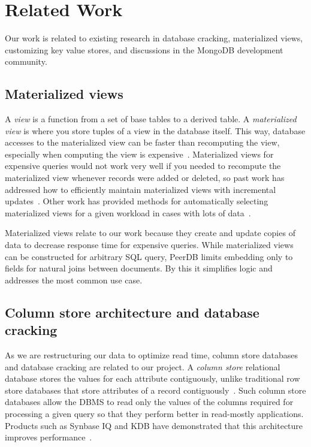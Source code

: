 \section{Related Work}

Our work is related to existing research in database cracking, materialized views, customizing key value stores, and discussions in the MongoDB development community.

\subsection{Materialized views}

A {\em view} is a function from a set of base tables to a derived table.
A {\em materialized view} is where you store tuples of a view in the database itself.
This way, database accesses to the materialized view can be faster than recomputing the view, especially when computing the view is expensive~\cite{Gupta1995}.
Materialized views for expensive queries would not work very well if you needed to recompute the materialized view whenever records were added or deleted, so past work has addressed how to efficiently maintain materialized views with incremental updates~\cite{Larson1985,Blakeley1986,Gupta1995,Zhou2007,Zhou2007a}.
Other work has provided methods for automatically selecting materialized views for a given workload in cases with lots of data~\cite{Agrawal2000,Yang1997}. 

Materialized views relate to our work because they create and update copies of data to decrease response time for expensive queries.
While materialized views can be constructed for arbitrary SQL query, PeerDB limits embedding only to fields for natural joins between documents.
By this it simplifies logic and addresses the most common use case.

\subsection{Column store architecture and database cracking}

As we are restructuring our data to optimize read time, column store databases and database cracking are related to our project.
A {\em column store} relational database stores the values for each attribute contiguously, unlike traditional row store databases that store attributes of a record contiguously~\cite{Stonebraker}.
Such column store databases allow the DBMS to read only the values of the columns required for processing a given query so that they perform better in read-mostly applications.
Products such as Synbase IQ and KDB have demonstrated that this architecture improves performance~\cite{Stonebraker,French1995}. 

